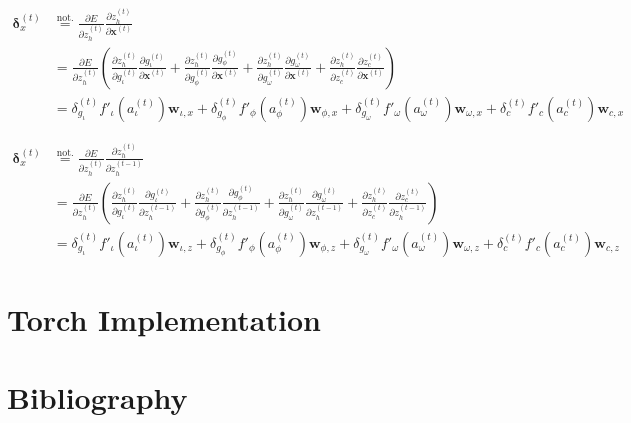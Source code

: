 \documentclass[11pt]{article}
\begin{document}
\begin{equation}
\begin{split}
    \boldsymbol{\delta}_x^{(t)} &\overset{\text{not.}}{=} \displaystyle\frac{\partial E}{\partial z_h^{(t)}}  \displaystyle\frac{\partial z_h^{(t)}}{\partial \mathbf{x}^{(t)}} \\
    &= \displaystyle\frac{\partial E}{\partial z_h^{(t)}} \left(
            \displaystyle\frac{\partial z_h^{(t)}}{\partial g_{\iota}^{(t)}} \displaystyle\frac{\partial g_{\iota}^{(t)}}{\partial \mathbf{x}^{(t)}} +
            \displaystyle\frac{\partial z_h^{(t)}}{\partial g_{\phi}^{(t)}} \displaystyle\frac{\partial g_{\phi}^{(t)}}{\partial \mathbf{x}^{(t)}} +
            \displaystyle\frac{\partial z_h^{(t)}}{\partial g_{\omega}^{(t)}} \displaystyle\frac{\partial g_{\omega}^{(t)}}{\partial \mathbf{x}^{(t)}} +
            \displaystyle\frac{\partial z_h^{(t)}}{\partial z_{c}^{(t)}} \displaystyle\frac{\partial z_{c}^{(t)}}{\partial \mathbf{x}^{(t)}} \right)\\
            &= \delta_{g_{\iota}}^{(t)} f'_{\iota}\left(a_{\iota}^{(t)}\right) \mathbf{w}_{\iota, x} +
               \delta_{g_{\phi}}^{(t)} f'_{\phi}\left(a_{\phi}^{(t)}\right) \mathbf{w}_{\phi, x} +
               \delta_{g_{\omega}}^{(t)} f'_{\omega}\left(a_{\omega}^{(t)}\right) \mathbf{w}_{\omega, x} +
               \delta_{c}^{(t)} f'_{c}\left(a_{c}^{(t)}\right) \mathbf{w}_{c, x}
\end{split}    
\end{equation}

\begin{equation}
\begin{split}
    \boldsymbol{\delta}_x^{(t)} &\overset{\text{not.}}{=} \displaystyle\frac{\partial E}{\partial z_h^{(t)}}  \displaystyle\frac{\partial z_h^{(t)}}{\partial z_h^{(t-1)}} \\
    &= \displaystyle\frac{\partial E}{\partial z_h^{(t)}} \left(
            \displaystyle\frac{\partial z_h^{(t)}}{\partial g_{\iota}^{(t)}} \displaystyle\frac{\partial g_{\iota}^{(t)}}{\partial z_h^{(t-1)}} +
            \displaystyle\frac{\partial z_h^{(t)}}{\partial g_{\phi}^{(t)}} \displaystyle\frac{\partial g_{\phi}^{(t)}}{\partial z_h^{(t-1)}} +
            \displaystyle\frac{\partial z_h^{(t)}}{\partial g_{\omega}^{(t)}} \displaystyle\frac{\partial g_{\omega}^{(t)}}{\partial z_h^{(t-1)}} +
            \displaystyle\frac{\partial z_h^{(t)}}{\partial z_{c}^{(t)}} \displaystyle\frac{\partial z_{c}^{(t)}}{\partial z_h^{(t-1)}} \right)\\
            &= \delta_{g_{\iota}}^{(t)} f'_{\iota}\left(a_{\iota}^{(t)}\right) \mathbf{w}_{\iota, z} +
               \delta_{g_{\phi}}^{(t)} f'_{\phi}\left(a_{\phi}^{(t)}\right) \mathbf{w}_{\phi, z} +
               \delta_{g_{\omega}}^{(t)} f'_{\omega}\left(a_{\omega}^{(t)}\right) \mathbf{w}_{\omega, z} +
               \delta_{c}^{(t)} f'_{c}\left(a_{c}^{(t)}\right) \mathbf{w}_{c, z}
\end{split}    
\end{equation}

\section{Torch Implementation}

\appendix
\section{Bibliography}
\end{document}
